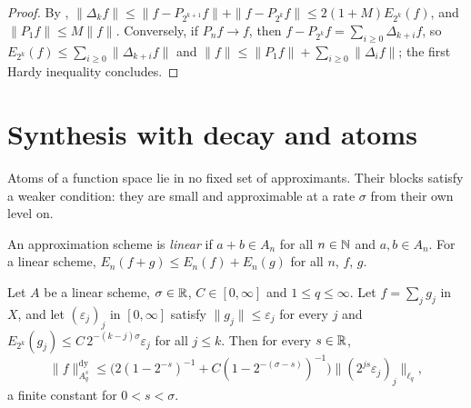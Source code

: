 \begin{proof}
\leanok
By , $\|\Delta_k f\| \leq \|f - P_{2^{k+1}} f\| + \|f - P_{2^k} f\| \leq
2(1 + M) E_{2^k}(f)$, and $\|P_1 f\| \leq M \|f\|$. Conversely, if $P_n f \to f$, then
$f - P_{2^k} f = \sum_{i \geq 0} \Delta_{k+i} f$, so $E_{2^k}(f) \leq \sum_{i \geq 0}
\|\Delta_{k+i} f\|$ and $\|f\| \leq \|P_1 f\| + \sum_{i \geq 0} \|\Delta_i f\|$; the first
Hardy inequality concludes.
\end{proof}

\section{Synthesis with decay and atoms}

Atoms of a function space lie in no fixed set of approximants. Their blocks satisfy a weaker
condition: they are small and approximable at a rate $\sigma$ from their own level on.

\begin{definition}
\label{def:linear-scheme}
\leanok
{}
An approximation scheme is \emph{linear} if $a + b \in A_n$ for all $n \in \mathbb{N}$ and
$a, b \in A_n$. For a linear scheme, $E_n(f + g) \leq E_n(f) + E_n(g)$ for all $n$, $f$, $g$.
\end{definition}

\begin{theorem}
\label{thm:synthesis-decay}
\leanok
{}
Let $A$ be a linear scheme, $\sigma \in \mathbb{R}$, $C \in [0, \infty]$ and $1 \leq q \leq \infty$.
Let $f = \sum_j g_j$ in $X$, and let $(\varepsilon_j)_j$ in $[0, \infty]$ satisfy
$\|g_j\| \leq \varepsilon_j$ for every $j$ and $E_{2^k}(g_j) \leq C \, 2^{-(k-j)\sigma}
\varepsilon_j$ for all $j \leq k$. Then for every $s \in \mathbb{R}$,
\[
  \|f\|^{\mathrm{dy}}_{A^s_q} \leq \bigl(2 (1 - 2^{-s})^{-1} + C (1 - 2^{-(\sigma - s)})^{-1}\bigr)
  \bigl\|(2^{js} \varepsilon_j)_j\bigr\|_{\ell_q} ,
\]
a finite constant for $0 < s < \sigma$.
\end{theorem}

